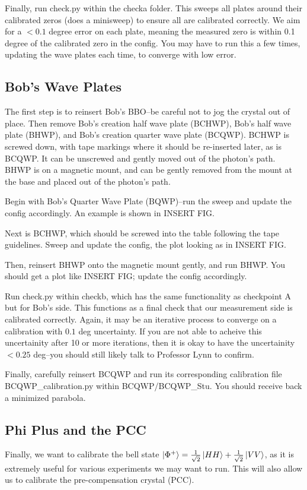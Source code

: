 \documentclass{paper}[11pt]
\begin{document}
Finally, run check.py within the checka folder. This sweeps all plates around their calibrated zeros (does a minisweep) to ensure all are calibrated correctly. We aim for a $< 0.1$ degree error on each plate, meaning the measured zero is within 0.1 degree of the calibrated zero in the config. You may have to run this a few times, updating the wave plates each time, to converge with low error. 

\subsection{Bob's Wave Plates}
The first step is to reinsert Bob's BBO--be careful not to jog the crystal out of place. Then remove Bob's creation half wave plate (BCHWP), Bob's half wave plate (BHWP), and Bob's creation quarter wave plate (BCQWP). BCHWP is screwed down, with tape markings where it should be re-inserted later, as is BCQWP. It can be unscrewed and gently moved out of the photon's path. BHWP is on a magnetic mount, and can be gently removed from the mount at the base and placed out of the photon's path. 

Begin with Bob's Quarter Wave Plate (BQWP)--run the sweep and update the config accordingly. An example is shown in INSERT FIG. 

Next is BCHWP, which should be screwed into the table following the tape guidelines. Sweep and update the config, the plot looking as in INSERT FIG.

Then, reinsert BHWP onto the magnetic mount gently, and run BHWP. You should get a plot like INSERT FIG; update the config accordingly. 

Run check.py within checkb, which has the same functionality as checkpoint A but for Bob's side. This functions as a final check that our measurement side is calibrated correctly. Again, it may be an iterative process to converge on a calibration with $0.1$ deg uncertainty. If you are not able to acheive this uncertainity after 10 or more iterations, then it is okay to have the uncertainity $<0.25$ deg--you should still likely talk to Professor Lynn to confirm.

Finally, carefully reinsert BCQWP and run its corresponding calibration file BCQWP\_calibration.py within BCQWP/BCQWP\_Stu. You should receive back a minimized parabola.

\subsection{Phi Plus and the PCC}
Finally, we want to calibrate the bell state $\ket{\Phi^+} = \frac{1}{\sqrt{2}}\ket{HH} + \frac{1}{\sqrt{2}}\ket{VV}$, as it is extremely useful for various experiments we may want to run. This will also allow us to calibrate the pre-compensation crystal (PCC).
\end{document}

